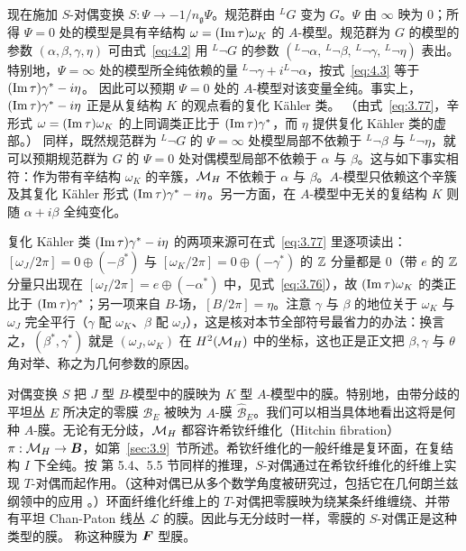 现在施加 $S$-对偶变换 $S:\Psi\to -1/n_{\mathfrak
g}\Psi$。规范群由 $^LG$ 变为 $G$。$\Psi$
由 $\infty$ 映为 0；所得 $\Psi=0$ 处的模型是具有辛结构 $\omega=({\rm Im\,\tau})\omega_K$ 的 $A$-模型。规范群为 $G$ 的模型的参数
$(\alpha,\beta,\gamma,\eta)$ 可由式~\eqref{eq:4.2} 用 $^L\neg G$ 的参数
$(^L\neg\alpha,\,^L\neg\beta,\,^L\neg\gamma,\,^L\neg\eta)$ 表出。特别地，$\Psi=\infty$ 处的模型所全纯依赖的量
$^L\neg\gamma+i^L\neg\alpha$，按式~\eqref{eq:4.3} 等于 $({\rm Im}\,\tau) \gamma^*-i\eta$。
因此可以预期 $\Psi=0$ 处的 $A$-模型对该变量全纯。事实上，$({\rm Im}\,\tau)\gamma^*-i\eta$ 正是从复结构 $K$ 的观点看的复化 Kähler 类。
（由式~\eqref{eq:3.77}，辛形式 $\omega=({\rm Im}\,\tau)
\omega_K$ 的上同调类正比于 $({\rm Im}\,\tau)\gamma^*$，而 $\eta$ 提供复化 Kähler 类的虚部。）
同样，既然规范群为
$^L\neg G$ 的 $\Psi=\infty$ 处模型局部不依赖于 $^L\neg\beta$ 与 $^L\neg\eta$，就可以预期规范群为 $G$ 的 $\Psi=0$ 处对偶模型局部不依赖于 $\alpha$ 与
$\beta$。这与如下事实相符：作为带有辛结构 $\omega_K$ 的辛簇，${{\mathcal{M}}_H}$ 不依赖于 $\alpha$ 与
$\beta$。$A$-模型只依赖这个辛簇及其复化 Kähler 形式 $({\rm Im}\,\tau)\gamma^*-i\eta$。另一方面，在 $A$-模型中无关的复结构 $K$ 则随 $\alpha+i\beta$ 全纯变化。

\begin{yizhu}[含糊点拨]
复化 Kähler 类 $({\rm Im}\,\tau)\gamma^*-i\eta$ 的两项来源可在式~\eqref{eq:3.77} 里逐项读出：$[\omega_J/2\pi]=0\oplus(-\beta^*)$ 与 $[\omega_K/2\pi]=0\oplus(-\gamma^*)$ 的 ${\mathbb{Z}}$ 分量都是 $0$（带 $e$ 的 ${\mathbb{Z}}$ 分量只出现在 $[\omega_I/2\pi]=e\oplus(-\alpha^*)$ 中，见式~\eqref{eq:3.76}），故 $({\rm Im}\,\tau)\omega_K$ 的类正比于 $({\rm Im}\,\tau)\gamma^*$；另一项来自 $B$-场，$[B/2\pi]=\eta$。注意 $\gamma$ 与 $\beta$ 的地位关于 $\omega_K$ 与 $\omega_J$ 完全平行（$\gamma$ 配 $\omega_K$、$\beta$ 配 $\omega_J$），这是核对本节全部符号最省力的办法：换言之，$(\beta^*,\gamma^*)$ 就是 $(\omega_J,\omega_K)$ 在 $H^2({{\mathcal{M}}_H})$ 中的坐标，这也正是正文把 $\beta,\gamma$ 与 $\theta$ 角对举、称之为几何参数的原因。
\end{yizhu}

对偶变换 $S$ 把 $J$ 型 $B$-模型中的膜映为 $K$ 型
$A$-模型中的膜。特别地，由带分歧的平坦丛 $E$ 所决定的零膜 ${\mathcal B}_E$ 被映为 $A$-膜 $\hat{\mathcal
B}_E$。我们可以相当具体地看出这将是何种 $A$-膜。无论有无分歧，${{\mathcal{M}}_H}$ 都容许希钦纤维化（Hitchin fibration）
$\pi:{{\mathcal{M}}_H}\to \bm{B}$，如第~\ref{sec:3.9}~节所述。希钦纤维化的一般纤维是复环面，在复结构 $I$ 下全纯。按 \cite{ref8} 第 5.4、5.5 节同样的推理，$S$-对偶通过在希钦纤维化的纤维上实现 $T$-对偶而起作用。（这种对偶已从多个数学角度被研究过，包括它在几何朗兰兹纲领中的应用
\cite{ref69,ref70,ref71}。）环面纤维化纤维上的 $T$-对偶把零膜映为绕某条纤维缠绕、并带有平坦 Chan-Paton 线丛 ${\mathcal L}$ 的膜。因此与无分歧时一样，零膜的 $S$-对偶正是这种类型的膜。\cite{ref8} 称这种膜为 ${\bm{F}}$ 型膜。

